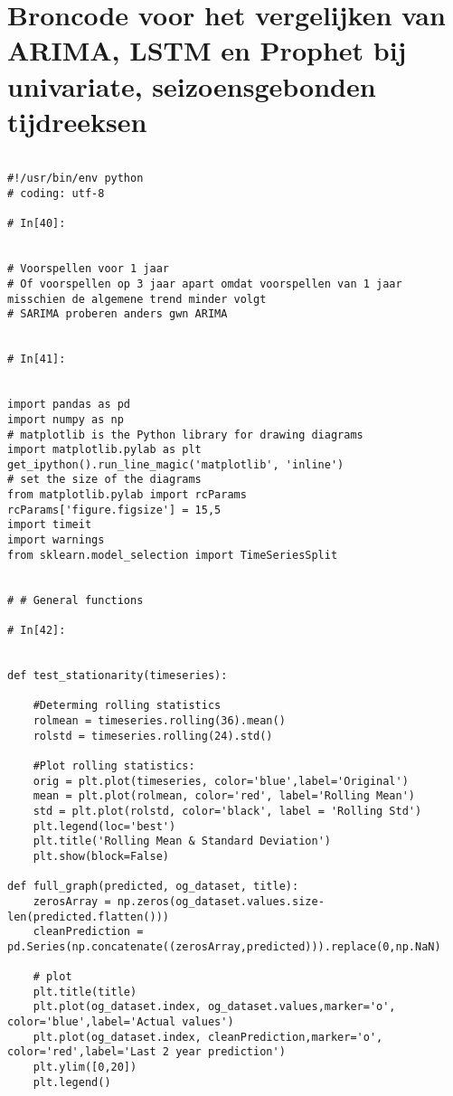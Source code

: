 \section{Broncode voor het vergelijken van ARIMA, LSTM en Prophet bij univariate, seizoensgebonden tijdreeksen}  %
\begin{verbatim}

#!/usr/bin/env python
# coding: utf-8

# In[40]:


# Voorspellen voor 1 jaar
# Of voorspellen op 3 jaar apart omdat voorspellen van 1 jaar misschien de algemene trend minder volgt
# SARIMA proberen anders gwn ARIMA


# In[41]:


import pandas as pd
import numpy as np
# matplotlib is the Python library for drawing diagrams
import matplotlib.pylab as plt
get_ipython().run_line_magic('matplotlib', 'inline')
# set the size of the diagrams
from matplotlib.pylab import rcParams
rcParams['figure.figsize'] = 15,5
import timeit
import warnings
from sklearn.model_selection import TimeSeriesSplit


# # General functions

# In[42]:


def test_stationarity(timeseries):
    
    #Determing rolling statistics
    rolmean = timeseries.rolling(36).mean()
    rolstd = timeseries.rolling(24).std()

    #Plot rolling statistics:
    orig = plt.plot(timeseries, color='blue',label='Original')
    mean = plt.plot(rolmean, color='red', label='Rolling Mean')
    std = plt.plot(rolstd, color='black', label = 'Rolling Std')
    plt.legend(loc='best')
    plt.title('Rolling Mean & Standard Deviation')
    plt.show(block=False)
    
def full_graph(predicted, og_dataset, title):
    zerosArray = np.zeros(og_dataset.values.size-len(predicted.flatten()))
    cleanPrediction = pd.Series(np.concatenate((zerosArray,predicted))).replace(0,np.NaN)
    
    # plot
    plt.title(title)
    plt.plot(og_dataset.index, og_dataset.values,marker='o', color='blue',label='Actual values')
    plt.plot(og_dataset.index, cleanPrediction,marker='o', color='red',label='Last 2 year prediction')
    plt.ylim([0,20])
    plt.legend()


\end{verbatim}
